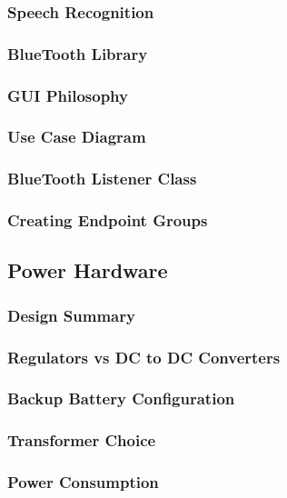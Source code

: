  \subsubsection{Speech Recognition}
\lipsum[1]
  \subsubsection{BlueTooth Library}
\lipsum[1]
  \subsubsection{GUI Philosophy}
\lipsum[1]
  \subsubsection{Use Case Diagram}
\lipsum[1]
  \subsubsection{BlueTooth Listener Class}
\lipsum[1]
  \subsubsection{Creating Endpoint Groups}
\lipsum[1]
 \subsection{Power Hardware}
\lipsum[1]
  \subsubsection{Design Summary}
\lipsum[1]
  \subsubsection{Regulators vs DC to DC Converters}
\lipsum[1]
  \subsubsection{Backup Battery Configuration}
\lipsum[1]
  \subsubsection{Transformer Choice}
\lipsum[1]
  \subsubsection{Power Consumption}
\lipsum[1]
